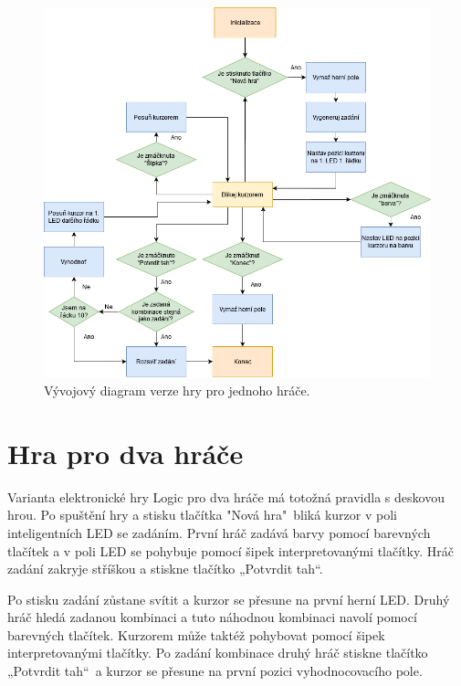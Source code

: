 \begin{figure}[!h]
    \begin{center}
        \includegraphics[scale=0.55]{obrazky/vyvojovy_diagram_1_hrac.png}
    \end{center}
    \caption[Vývojový diagram verze hry pro jednoho hráče]{Vývojový diagram verze hry pro jednoho hráče.}
    \end{figure}

\section{Hra pro dva hráče}
Varianta elektronické hry Logic pro dva hráče má totožná pravidla s deskovou hrou. Po spuštění hry a stisku tlačítka "Nová hra"\ bliká 
kurzor v poli inteligentních LED se zadáním. První hráč zadává barvy pomocí barevných tlačítek a v poli LED se pohybuje pomocí šipek 
interpretovanými tlačítky. Hráč zadání zakryje stříškou a stiskne tlačítko „Potvrdit tah“. 

Po stisku zadání zůstane svítit a kurzor se přesune na první herní LED. Druhý hráč hledá zadanou kombinaci a tuto náhodnou kombinaci 
navolí pomocí barevných tlačítek. Kurzorem může taktéž pohybovat pomocí šipek interpretovanými tlačítky. Po zadání kombinace 
druhý hráč stiskne tlačítko „Potvrdit tah“\  a kurzor se přesune na první pozici vyhodnocovacího pole. 

